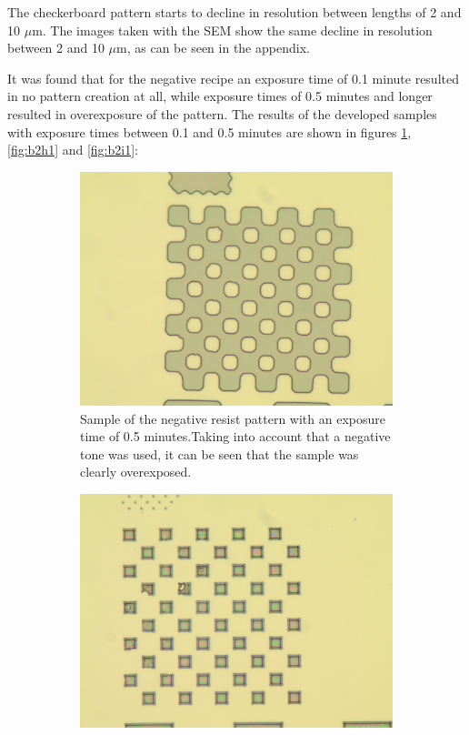 The checkerboard pattern starts to decline in resolution between lengths of 2 and 10 $\mu$m. The images taken with the SEM show the same decline in resolution between 2 and 10 $\mu$m, as can be seen in the appendix.


It was found that for the negative recipe an exposure time of 0.1 minute resulted in no pattern creation at all, while exposure times of 0.5 minutes and longer resulted in overexposure of the pattern. The results of the developed samples with exposure times between 0.1 and 0.5 minutes are shown in figures \ref{fig:b2d1}, \ref{fig:b2h1} and \ref{fig:b2i1}:

\begin{figure}[ht]
    \centering
    \begin{subfigure}[t]{0.3\linewidth}
        \centering
        \includegraphics[width=\textwidth]{data/b2d1.jpg}
	\caption{Sample of the negative resist pattern with an exposure time of 0.5 minutes.Taking into account that a negative tone was used, it can be seen that the sample was clearly overexposed.}
	\label{fig:b2d1}
    \end{subfigure}
    \hfill
    \begin{subfigure}[t]{0.3\linewidth}
        \centering
        \includegraphics[width=\textwidth]{data/b2h1.jpg}

\end{subfigure}
\end{figure}

